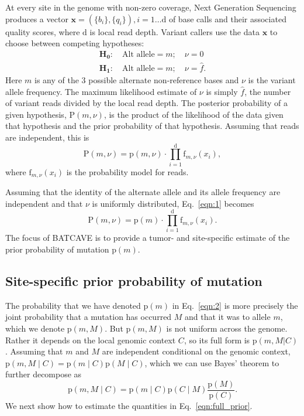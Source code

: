 \documentclass[a4,center,fleqn]{NAR}
\newcommand{\batcave}{BATCAVE }
\begin{document}
At every site in the genome with non-zero coverage, Next Generation Sequencing produces a vector $\mathbf{x}  = (\{b_i\},\{q_i\}), i = 1\dots \mathrm{d}$ of base calls and their associated quality scores, where $\mathrm{d}$ is local read depth.
Variant callers use the data $\mathbf{x}$ to choose between competing hypotheses:
\begin{equation}
  \label{eqn:hypothesis}
  \begin{array}{l}
    \mathbf{H_0}:\quad \textrm{Alt allele} = m;\quad\nu = 0\\
    \mathbf{H_1}:\quad \textrm{Alt allele} = m;\quad\nu = \hat{f}.
  \end{array}
\end{equation}
Here $m$ is any of the 3 possible alternate non-reference bases and $\nu$ is the variant allele frequency.
The maximum likelihood estimate of $\nu$ is simply $\hat{f}$, the number of variant reads divided by the local read depth.
The posterior probability of a given hypothesis, $\mathrm{P}(m,\nu)$, is the product of the likelihood of the data given that hypothesis and the prior probability of that hypothesis. 
Assuming that reads are independent, this is
\begin{equation}\label{eqn:1}
  \mathrm{P}(m,\nu) = \mathrm{p}(m,\nu) \cdot \prod_{i=1}^{\mathrm{d}} \textrm{f}_{m,\nu}(x_i),
\end{equation}
where $\textrm{f}_{m,\nu}(x_i)$ is the probability model for reads.

Assuming that the identity of the alternate allele and its allele frequency are independent and that $\nu$ is uniformly distributed, Eq.~\ref{eqn:1} becomes
\begin{equation}  \label{eqn:2}
  \mathrm{P}(m,\nu) = \mathrm{p}(m) \cdot \prod_{i=1}^{\mathrm{d}} \textrm{f}_{m,\nu}(x_i).
\end{equation}
The focus of \batcave is to provide a tumor- and site-specific estimate of the prior probability of mutation $\mathrm{p}(m)$.

\subsection{Site-specific prior probability of mutation}
The probability that we have denoted $\mathrm{p}(m)$ in Eq.~\ref{eqn:2} is more precisely the joint probability that a mutation has occurred $M$ and that it was to allele $m$, which we denote $\mathrm{p}(m,M)$.
But $\mathrm{p}(m,M)$ is not uniform across the genome.
Rather it depends on the local genomic context $C$, so its full form is $\mathrm{p}(m,M | C)$ \cite{Buisson2019}.
Assuming that $m$ and $M$ are independent conditional on the genomic context, $\mathrm{p}(m,M \mid C) = \mathrm{p}(m \mid C) \mathrm{p}(M \mid C)$, which we can use Bayes' theorem to further decompose as 
\begin{equation}
  \label{eqn:full_prior}
  \mathrm{p}(m,M \mid C) = \mathrm{p}(m \mid C) \mathrm{p}(C \mid M)\frac{\mathrm{p}(M)}{\mathrm{p}(C)}.
\end{equation}
We next show how to estimate the quantities in Eq.~\ref{eqn:full_prior}.
\end{document}
